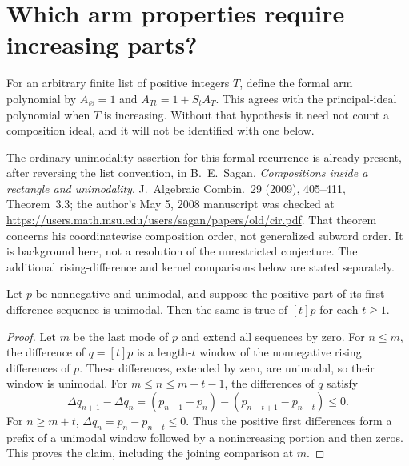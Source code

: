 \section{Which arm properties require increasing parts?}
For an arbitrary finite list of positive integers $T$, define the
formal arm polynomial by $A_\varnothing=1$ and
$A_{Tt}=1+S_tA_T$. This agrees with the principal-ideal polynomial
when $T$ is increasing. Without that hypothesis it need not count
a composition ideal, and it will not be identified with one below.

The ordinary unimodality assertion for this formal recurrence is
already present, after reversing the list convention, in
B.~E.~Sagan, \emph{Compositions inside a rectangle and unimodality},
J.~Algebraic Combin.~29 (2009), 405--411, Theorem~3.3;
the author's May 5, 2008 manuscript was checked at
\url{https://users.math.msu.edu/users/sagan/papers/old/cir.pdf}.
That theorem concerns his coordinatewise composition order, not
generalized subword order. It is background here, not a resolution
of the unrestricted conjecture. The additional rising-difference
and kernel comparisons below are stated separately.

\begin{lemma}
Let $p$ be nonnegative and unimodal, and suppose the positive
part of its first-difference sequence is unimodal. Then the same
is true of $[t]p$ for each $t\ge1$.
\end{lemma}
\begin{proof}
Let $m$ be the last mode of $p$ and extend all sequences by zero.
For $n\le m$, the difference of $q=[t]p$ is a length-$t$ window
of the nonnegative rising differences of $p$. These differences,
extended by zero, are unimodal, so their window is unimodal.
For $m\le n\le m+t-1$, the differences of $q$ satisfy
\[
 \Delta q_{n+1}-\Delta q_n
  =(p_{n+1}-p_n)-(p_{n-t+1}-p_{n-t})\le0.
\]
For $n\ge m+t$, $\Delta q_n=p_n-p_{n-t}\le0$.
Thus the positive first differences form a prefix of a unimodal
window followed by a nonincreasing portion and then zeros.
This proves the claim, including the joining comparison at $m$.
\end{proof}

